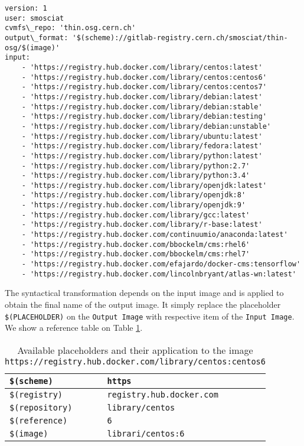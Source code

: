 \begin{lstlisting}[caption={Example of a small \textit{wish-list}},label={lst:wish-list}]
version: 1
user: smosciat
cvmfs\_repo: 'thin.osg.cern.ch'
output\_format: '$(scheme)://gitlab-registry.cern.ch/smosciat/thin-osg/$(image)'
input:
    - 'https://registry.hub.docker.com/library/centos:latest'
    - 'https://registry.hub.docker.com/library/centos:centos6'
    - 'https://registry.hub.docker.com/library/centos:centos7'
    - 'https://registry.hub.docker.com/library/debian:latest'
    - 'https://registry.hub.docker.com/library/debian:stable'
    - 'https://registry.hub.docker.com/library/debian:testing'
    - 'https://registry.hub.docker.com/library/debian:unstable'
    - 'https://registry.hub.docker.com/library/ubuntu:latest'
    - 'https://registry.hub.docker.com/library/fedora:latest'
    - 'https://registry.hub.docker.com/library/python:latest'
    - 'https://registry.hub.docker.com/library/python:2.7'
    - 'https://registry.hub.docker.com/library/python:3.4'
    - 'https://registry.hub.docker.com/library/openjdk:latest'
    - 'https://registry.hub.docker.com/library/openjdk:8'
    - 'https://registry.hub.docker.com/library/openjdk:9'
    - 'https://registry.hub.docker.com/library/gcc:latest'
    - 'https://registry.hub.docker.com/library/r-base:latest'
    - 'https://registry.hub.docker.com/continuumio/anaconda:latest'
    - 'https://registry.hub.docker.com/bbockelm/cms:rhel6'
    - 'https://registry.hub.docker.com/bbockelm/cms:rhel7'
    - 'https://registry.hub.docker.com/efajardo/docker-cms:tensorflow'
    - 'https://registry.hub.docker.com/lincolnbryant/atlas-wn:latest'
\end{lstlisting}

The syntactical transformation depends on the input image and is applied to
obtain the final name of the output image. It simply replace the placeholder
\texttt{\$(PLACEHOLDER)} on the \texttt{Output Image}  with respective item of
the \texttt{Input Image}. We show a reference table on Table \ref{table:placeholder}.

\begin{table}
\centering
\begin{tabular}{l|l} 
\toprule
    \texttt{\$(scheme)}     & \texttt{https}                    \\ 
\hline
    \texttt{\$(registry)}   & \texttt{registry.hub.docker.com}  \\ 
\hline
    \texttt{\$(repository)} & \texttt{library/centos}           \\ 
\hline
    \texttt{\$(reference)}  & \texttt{6}                        \\ 
\hline
    \texttt{\$(image)}      & \texttt{librari/centos:6}         \\
\bottomrule
\end{tabular}
    \caption{Available placeholders and their application to the image \texttt{https://registry.hub.docker.com/library/centos:centos6}}
\label{table:placeholder}
\end{table}

